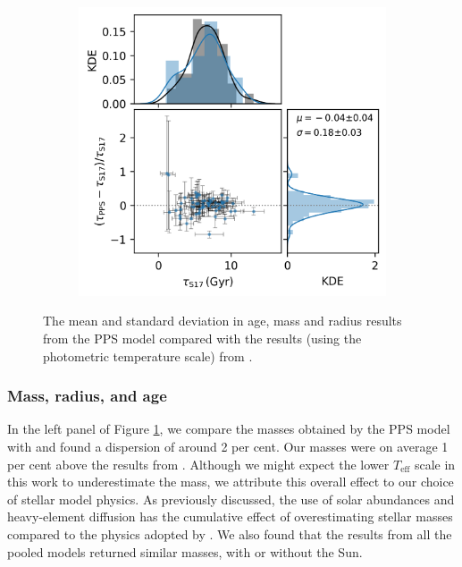 \documentclass[a4paper,fleqn,usenatbib]{mnras}
\newcommand{\teff}{\ensuremath{T_\mathrm{eff}}}
\begin{document}
\begin{figure}
\begin{subfigure}[b]{.33\linewidth}
    \end{subfigure}%
    \begin{subfigure}[b]{.33\linewidth}
        \includegraphics[width=\linewidth]{figures/age_comp.png}
    \end{subfigure}%
    \caption{The mean and standard deviation in age, mass and radius results from the PPS model compared with the results (using the photometric temperature scale) from .}
    \label{fig:comp}
\end{figure}

\subsubsection{Mass, radius, and age}

In the left panel of Figure \ref{fig:comp}, we compare the masses obtained by the PPS model with  and found a dispersion of around 2 per cent. Our masses were on average 1 per cent above the results from . Although we might expect the lower $\teff$ scale in this work to underestimate the mass, we attribute this overall effect to our choice of stellar model physics. As previously discussed, the use of \citet{Asplund.Grevesse.ea2009} solar abundances and heavy-element diffusion has the cumulative effect of overestimating stellar masses compared to the physics adopted by . We also found that the results from all the pooled models returned similar masses, with or without the Sun.
\end{document}
